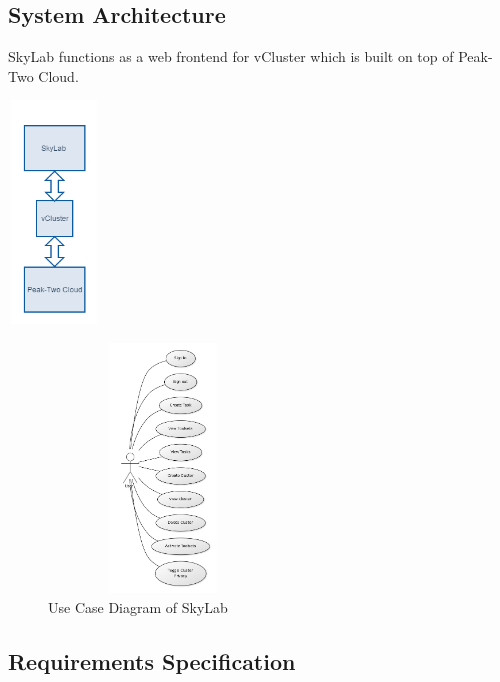 \documentclass[journal]{./IEEE/IEEEtran}
\begin{document}
    \subsection{System Architecture}
    SkyLab functions as a web frontend for vCluster which is built on top of Peak-Two Cloud.
   	\begin{center}			
		\includegraphics[width=92px,height=224px]{./images/system_architecture.png}			
	\end{center}	
    



	
    \begin{figure}
      \centering
      \includegraphics[width=230px,height=250px]{./images/use_case_simple_normal.png}
      \caption{Use Case Diagram of SkyLab}\label{System Architecture}
    \end{figure}

    \subsection{Requirements Specification}
\end{document}
